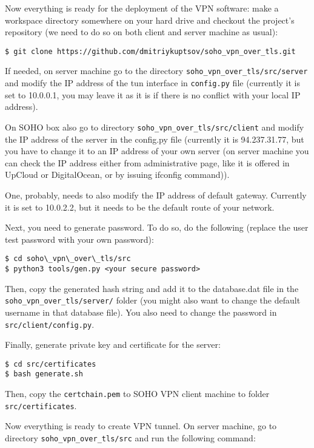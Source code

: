 Now everything is ready for the deployment 
of the VPN software: make a workspace directory 
somewhere on your hard drive and checkout the 
project's repository (we need to do so on both 
client and server machine as usual):

\begin{verbatim}
$ git clone https://github.com/dmitriykuptsov/soho_vpn_over_tls.git
\end{verbatim}

If needed, on server machine go to the directory 
\texttt{soho\_vpn\_over\_tls/src/server} and modify the IP address 
of the tun interface in \texttt{config.py} file (currently 
it is set to 10.0.0.1, you may leave it as it is 
if there is no conflict with your local IP address).

On SOHO box also go to directory 
\texttt{soho\_vpn\_over\_tls/src/client}
and modify the IP address of the server in the config.py 
file (currently it is 94.237.31.77, but you have to change 
it to an IP address of your own server (on server machine 
you can check the IP address either from administrative page, 
like it is offered in UpCloud or DigitalOcean, or by issuing 
ifconfig command)).

One, probably, needs to also modify the IP address of default 
gateway. Currently it is set to 10.0.2.2, but it needs to be the 
default route of your network.

Next, you need to generate password. To do so, 
do the following (replace the user test password with your own 
password):

\begin{verbatim}
$ cd soho\_vpn\_over\_tls/src
$ python3 tools/gen.py <your secure password>
\end{verbatim}

Then, copy the generated hash string and add it to the 
database.dat file in the \texttt{soho\_vpn\_over\_tls/server/} folder (you 
might also want to change the default username in that 
database file). You also need to change the password in
\texttt{src/client/config.py}.

Finally, generate private key and certificate for the 
server:

\begin{verbatim}
$ cd src/certificates
$ bash generate.sh
\end{verbatim}

Then, copy the \texttt{certchain.pem} to SOHO VPN client machine
to folder \texttt{src/certificates}.

Now everything is ready to create VPN tunnel. 
On server machine, go to directory 
\texttt{soho\_vpn\_over\_tls/src} and run the 
following command:

